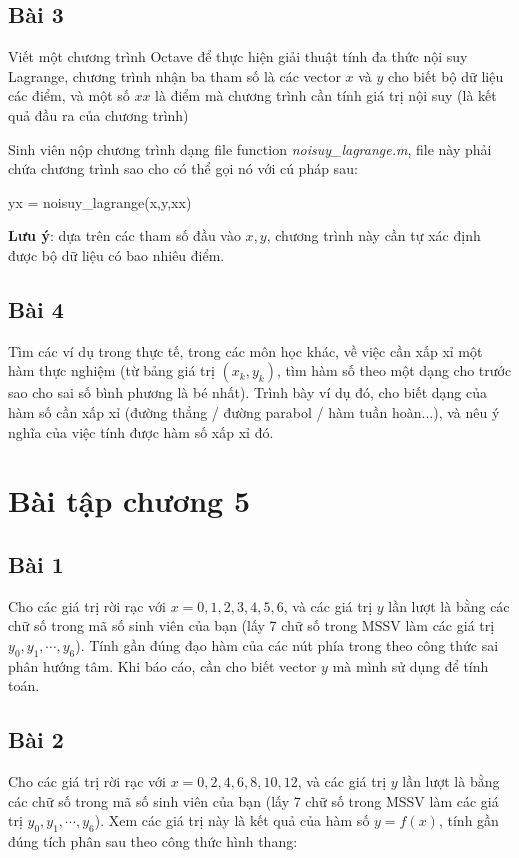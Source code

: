 \documentclass[12pt]{article}
\begin{document}
\subsection{Bài 3}
Viết một chương trình Octave để thực hiện giải thuật tính đa thức nội suy Lagrange, chương trình nhận ba tham số là các vector $x$ và $y$ cho biết bộ dữ liệu các điểm, và một số $xx$ là điểm mà chương trình cần tính giá trị nội suy (là kết quả đầu ra của chương trình)

Sinh viên nộp chương trình dạng file function \emph{noisuy\_lagrange.m}, file này phải chứa chương trình sao cho có thể gọi nó với cú pháp sau:

yx = noisuy\_lagrange(x,y,xx)

\textbf{Lưu ý}: dựa trên các tham số đầu vào $x, y$, chương trình này cần tự xác định được bộ dữ liệu có bao nhiêu điểm.

\subsection{Bài 4}
Tìm các ví dụ trong thực tế, trong các môn học khác, về việc cần xấp xỉ một hàm thực nghiệm (từ bảng giá trị $(x_k,y_k)$, tìm hàm số theo một dạng cho trước sao cho sai số bình phương là bé nhất). Trình bày ví dụ đó, cho biết dạng của hàm số cần xấp xỉ (đường thẳng / đường parabol / hàm tuần hoàn...), và nêu ý nghĩa của việc tính được hàm số xấp xỉ đó.


\section{Bài tập chương 5}

\subsection{Bài 1}

Cho các giá trị rời rạc với $x = 0,1,2,3,4,5,6$, và các giá trị $y$ lần lượt là bằng các chữ số trong mã số sinh viên của bạn (lấy 7 chữ số trong MSSV làm các giá trị $y_0, y_1, \cdots, y_6$). Tính gần đúng đạo hàm của các nút phía trong theo công thức sai phân hướng tâm. Khi báo cáo, cần cho biết vector $y$ mà mình sử dụng để tính toán.

\subsection{Bài 2}

Cho các giá trị rời rạc với $x = 0,2,4,6,8,10,12$, và các giá trị $y$ lần lượt là bằng các chữ số trong mã số sinh viên của bạn (lấy 7 chữ số trong MSSV làm các giá trị $y_0, y_1, \cdots, y_6$). Xem các giá trị này là kết quả của hàm số $y=f(x)$, tính gần đúng tích phân sau theo công thức hình thang:
\end{document}
